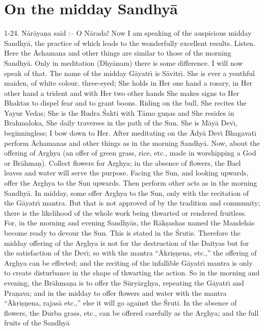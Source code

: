 \chapter{On the midday Sandhy\=a}

1-24. N\=ar\=aya\d{n}a said :-- O N\=arada! Now I am speaking of the auspicious midday Sandhy\=a, the practice of which leads to the wonderfully excellent results. Listen. Here the \=Achamana and other things are similar to those of the morning Sandhy\=a. Only in meditation (Dhy\=anam) there is some difference. I will now speak of that. The name of the midday G\=ayatr\={\i} is S\=avitr\={\i}. She is ever a youthful maiden, of white colour, three-eyed; She holds in Her one hand a rosary, in Her other hand a trident and with Her two other hands She makes signs to Her Bhaktas to dispel fear and to grant boons. Riding on the bull, She recites the Yayur Vedas; She is the Rudra \'Sakti with T\=amo gu\d{n}as and She resides in Brahmaloka, She daily traverses in the path of the Sun. She is M\=ay\=a Dev\={\i}, beginningless; I bow down to Her. After meditating on the \=Ady\=a Dev\={\i} Bhagavat\={\i} perform \=Achamanas and other things as in the morning Sandhy\=a. Now, about the offering of Arghya (an offer of green grass, rice, etc., made in worshipping a God or Br\=ahma\d{n}). Collect flowers for Arghya; in the absence of flowers, the Bael leaves and water will serve the purpose. Facing the Sun, and looking upwards, offer the Arghya to the Sun upwards. Then perform other acts as in the morning Sandhy\=a. In midday, some offer Arghya to the Sun, only with the recitation of the G\=ayatr\={\i} mantra. But that is not approved of by the tradition and community; there is the likelihood of the whole work being thwarted or rendered fruitless. For, in the morning and evening Sandhy\=as, the R\=ak\d{s}ashas named the Mandeh\=as become
ready to devour the Sun. This is stated in the \'Srutis. Therefore the midday offering of the Arghya is not for the destruction of the Daityas but for the satisfaction of the Dev\={\i}; so with the mantra ``\=Akri\d{s}\d{n}ena, etc.,'' the offering of Arghya can be effected; and the reciting of the infallible G\=ayatr\={\i} mantra is only to create disturbance in the shape of thwarting the action. So in the morning and evening, the Br\=ahma\d{n}a is to offer the S\=ury\=arghya, repeating the G\=ayatr\={\i} and Pra\d{n}ava; and in the midday to offer flowers and water with the mantra ``\=Akri\d{s}\d{n}ena, rajas\=a etc.,'' else it will go against the \'Sruti. In the absence of flowers, the Durba grass, etc., can be offered carefully as the Arghya; and the full fruits of the Sandhy\=a

